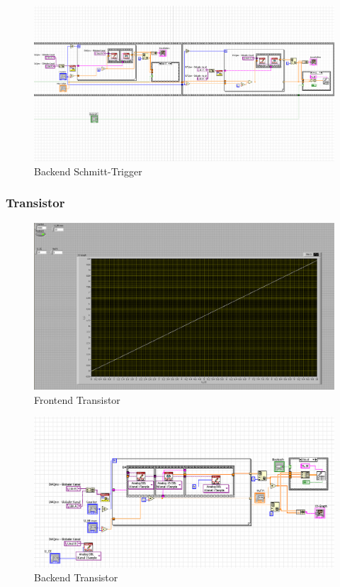 \documentclass[12pt,twoside,a4paper]{scrartcl}
\begin{document}
			\begin{figure}[H]
				\centering
				\includegraphics[width = 0.9 \textwidth]{Pictures/Programme/Backend_Schmitt}
				\caption{Backend Schmitt-Trigger}
			\end{figure}

		\subsubsection{Transistor}
			\label{Programme::Schmitt}
			\begin{figure}[H]
				\centering
				\includegraphics[width = 0.9 \textwidth]{Pictures/Programme/Frontend_Transistor}
				\caption{Frontend Transistor}
			\end{figure}

			\begin{figure}[H]
				\centering
				\includegraphics[width = 0.9 \textwidth]{Pictures/Programme/Backend_Transistor}
				\caption{Backend Transistor}
			\end{figure}
\end{document}
